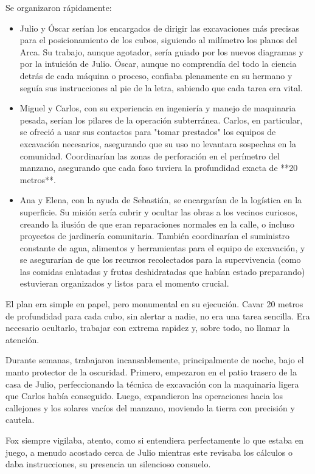 \documentclass[a4paper,12pt]{book}
\begin{document}
Se organizaron rápidamente:
\begin{itemize}
    \item Julio y Óscar serían los encargados de dirigir las excavaciones más precisas para el posicionamiento de los cubos, siguiendo al milímetro los planos del Arca. Su trabajo, aunque agotador, sería guiado por los nuevos diagramas y por la intuición de Julio. Óscar, aunque no comprendía del todo la ciencia detrás de cada máquina o proceso, confiaba plenamente en su hermano y seguía sus instrucciones al pie de la letra, sabiendo que cada tarea era vital.
    \item Miguel y Carlos, con su experiencia en ingeniería y manejo de maquinaria pesada, serían los pilares de la operación subterránea. Carlos, en particular, se ofreció a usar sus contactos para "tomar prestados" los equipos de excavación necesarios, asegurando que su uso no levantara sospechas en la comunidad. Coordinarían las zonas de perforación en el perímetro del manzano, asegurando que cada foso tuviera la profundidad exacta de **20 metros**.
    \item Ana y Elena, con la ayuda de Sebastián, se encargarían de la logística en la superficie. Su misión sería cubrir y ocultar las obras a los vecinos curiosos, creando la ilusión de que eran reparaciones normales en la calle, o incluso proyectos de jardinería comunitaria. También coordinarían el suministro constante de agua, alimentos y herramientas para el equipo de excavación, y se asegurarían de que los recursos recolectados para la supervivencia (como las comidas enlatadas y frutas deshidratadas que habían estado preparando) estuvieran organizados y listos para el momento crucial.
\end{itemize}

El plan era simple en papel, pero monumental en su ejecución. Cavar 20 metros de profundidad para cada cubo, sin alertar a nadie, no era una tarea sencilla. Era necesario ocultarlo, trabajar con extrema rapidez y, sobre todo, no llamar la atención.

Durante semanas, trabajaron incansablemente, principalmente de noche, bajo el manto protector de la oscuridad. Primero, empezaron en el patio trasero de la casa de Julio, perfeccionando la técnica de excavación con la maquinaria ligera que Carlos había conseguido. Luego, expandieron las operaciones hacia los callejones y los solares vacíos del manzano, moviendo la tierra con precisión y cautela.

Fox siempre vigilaba, atento, como si entendiera perfectamente lo que estaba en juego, a menudo acostado cerca de Julio mientras este revisaba los cálculos o daba instrucciones, su presencia un silencioso consuelo.
\end{document}
